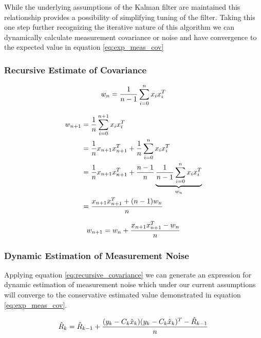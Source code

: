 \documentclass[a4paper]{article}
\begin{document}
	While the underlying assumptions of the Kalman filter are maintained this relationship provides a possibility of simplifying tuning of the filter. Taking this one step further recognizing the iterative nature of this algorithm we can dynamically calculate measurement covariance or noise and have convergence to the expected value in equation \ref{eq:exp_meas_cov}

	\subsubsection{Recursive Estimate of Covariance}

	\begin{equation}
		w_n = {1 \over n - 1} \displaystyle\sum_{i=0} ^{n} x_ix_i^T\\
	\end{equation}

	\begin{align*}
		w_{n+1} &= {1 \over n} \displaystyle\sum_{i=0} ^{n+1} x_ix_i^T\\
		&= {1 \over n} x_{n+1}x_{n+1}^T + {1 \over n} \displaystyle\sum_{i=0} ^{n} x_ix_i^T\\
		&= {1 \over n} x_{n+1}x_{n+1}^T + {n-1 \over n} \underbrace{{1 \over n -1} \displaystyle\sum_{i=0} ^{n} x_ix_i^T}_{w_n}\\
		&= {x_{n+1}x_{n+1}^T + (n - 1) w_n \over n}\\
	\end{align*}

	\begin{equation}
		w_{n+1} = w_n + {x_{n+1}x_{n+1}^T -w_n \over n}
		\label{eq:recursive_covariance}
	\end{equation}

	\subsubsection{Dynamic Estimation of Measurement Noise}

	Applying equation \ref{eq:recursive_covariance} we can generate an expression for dynamic estimation of measurement noise which under our current assumptions will converge to the conservative estimated value demonstrated in equation \ref{eq:exp_meas_cov}.


	\begin{equation}
		\hat{R}_k = \hat{R}_{k-1} + {(y_k - C_k \hat{x}_k)(y_k - C_k \hat{x}_k)^T - \hat{R}_{k-1} \over n}
	\end{equation}
\end{document}

